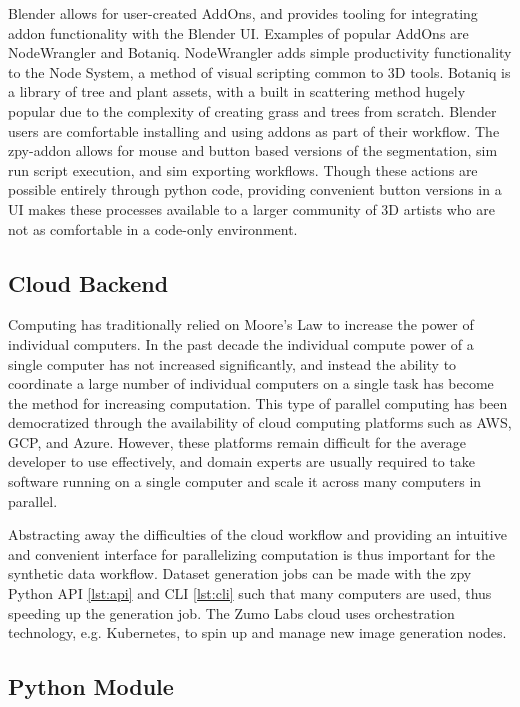 \documentclass{article}
\begin{document}
Blender allows for user-created AddOns, and provides tooling for integrating addon functionality with the Blender UI. Examples of popular AddOns are NodeWrangler and Botaniq. NodeWrangler adds simple productivity functionality to the Node System, a method of visual scripting common to 3D tools. Botaniq is a library of tree and plant assets, with a built in scattering method hugely popular due to the complexity of creating grass and trees from scratch. Blender users are comfortable installing and using addons as part of their workflow. The zpy-addon allows for mouse and button based versions of the segmentation, sim run script execution, and sim exporting workflows. Though these actions are possible entirely through python code, providing convenient button versions in a UI makes these processes available to a larger community of 3D artists who are not as comfortable in a code-only environment.

\subsection{Cloud Backend}
\label{sec:cloudbackend}

Computing has traditionally relied on Moore’s Law to increase the power of individual computers. In the past decade the individual compute power of a single computer has not increased significantly, and instead the ability to coordinate a large number of individual computers on a single task has become the method for increasing computation. This type of parallel computing has been democratized through the availability of cloud computing platforms such as AWS, GCP, and Azure. However, these platforms remain difficult for the average developer to use effectively, and domain experts are usually required to take software running on a single computer and scale it across many computers in parallel.

Abstracting away the difficulties of the cloud workflow and providing an intuitive and convenient interface for parallelizing computation is thus important for the synthetic data workflow. Dataset generation jobs can be made with the zpy Python API \ref{lst:api} and CLI \ref{lst:cli} such that many computers are used, thus speeding up the generation job. The Zumo Labs cloud uses orchestration technology, e.g. Kubernetes, to spin up and manage new image generation nodes.

\subsection{Python Module}
\label{sec:pythonmodule}
\end{document}
